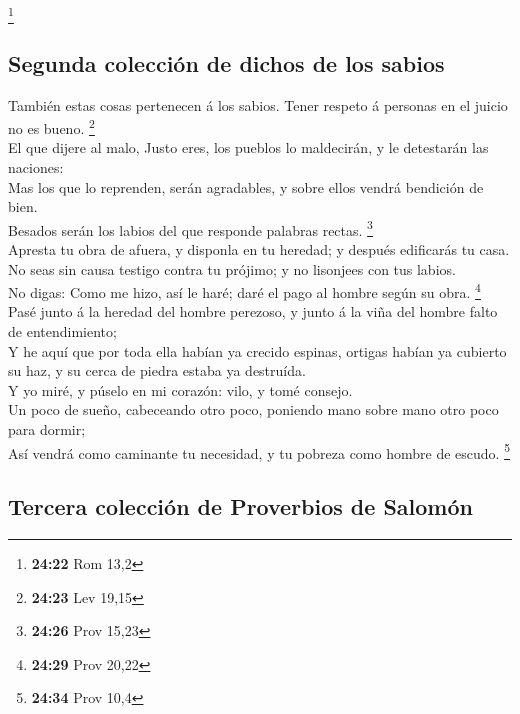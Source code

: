 \footnote{\textbf{24:22} Rom 13,2}

\hypertarget{segunda-colecciuxf3n-de-dichos-de-los-sabios}{%
\subsection{Segunda colección de dichos de los
sabios}\label{segunda-colecciuxf3n-de-dichos-de-los-sabios}}

 También estas cosas pertenecen á los sabios. Tener respeto
á personas en el juicio no es bueno. \footnote{\textbf{24:23} Lev 19,15}\\
 El que dijere al malo, Justo eres, los pueblos lo
maldecirán, y le detestarán las naciones:\\
 Mas los que lo reprenden, serán agradables, y sobre ellos
vendrá bendición de bien.\\
 Besados serán los labios del que responde palabras rectas.
\footnote{\textbf{24:26} Prov 15,23}\\
 Apresta tu obra de afuera, y disponla en tu heredad; y
después edificarás tu casa.\\
 No seas sin causa testigo contra tu prójimo; y no
lisonjees con tus labios.\\
 No digas: Como me hizo, así le haré; daré el pago al
hombre según su obra. \footnote{\textbf{24:29} Prov 20,22}\\
 Pasé junto á la heredad del hombre perezoso, y junto á la
viña del hombre falto de entendimiento;\\
 Y he aquí que por toda ella habían ya crecido espinas,
ortigas habían ya cubierto su haz, y su cerca de piedra estaba ya
destruída.\\
 Y yo miré, y púselo en mi corazón: vilo, y tomé consejo.\\
 Un poco de sueño, cabeceando otro poco, poniendo mano
sobre mano otro poco para dormir;\\
 Así vendrá como caminante tu necesidad, y tu pobreza como
hombre de escudo. \footnote{\textbf{24:34} Prov 10,4}

\hypertarget{tercera-colecciuxf3n-de-proverbios-de-salomuxf3n}{%
\subsection{Tercera colección de Proverbios de
Salomón}\label{tercera-colecciuxf3n-de-proverbios-de-salomuxf3n}}

